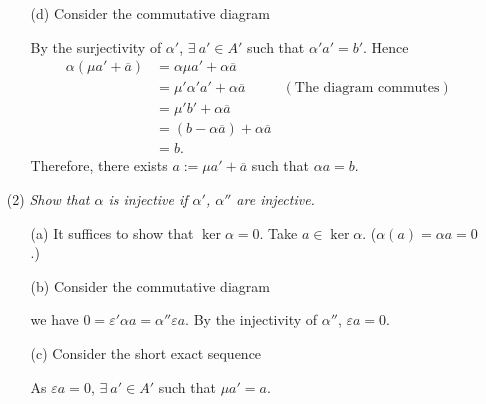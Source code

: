 \documentclass{article}
\begin{document}
\begin{enumerate}
\begin{enumerate}
  \item[(d)]
    Consider the commutative diagram
    \begin{center}
    \end{center}
    By the surjectivity of $\alpha'$,
    $\exists \: a' \in A'$ such that $\alpha' a' = b'$.
    Hence
    \begin{align*}
      \alpha(\mu a' + \overline{a})
      &= \alpha\mu a' + \alpha\overline{a} \\
      &= \mu'\alpha'a' + \alpha\overline{a}
        &(\text{The diagram commutes}) \\
      &= \mu'b' + \alpha\overline{a} \\
      &= (b - \alpha\overline{a}) + \alpha\overline{a} \\
      &= b.
    \end{align*}
    Therefore, there exists $a := \mu a' + \overline{a}$ such that $\alpha a = b$.
  \end{enumerate}

\item[(2)]
  \emph{Show that $\alpha$ is injective if $\alpha'$, $\alpha''$ are injective.}
  \begin{enumerate}
  \item[(a)]
    It suffices to show that $\ker\alpha = 0$.
    Take $a \in \ker\alpha$. ($\alpha(a) = \alpha a = 0$.)

  \item[(b)]
    Consider the commutative diagram
    \begin{center}
    \end{center}
    we have $0 = \varepsilon'\alpha a = \alpha''\varepsilon a$.
    By the injectivity of $\alpha''$, $\varepsilon a = 0$.

  \item[(c)]
    Consider the short exact sequence
    \begin{center}
    \end{center}
    As $\varepsilon a = 0$, $\exists \: a' \in A'$ such that
    $\mu a' = a$.


\end{enumerate}
\end{enumerate}
\end{document}
